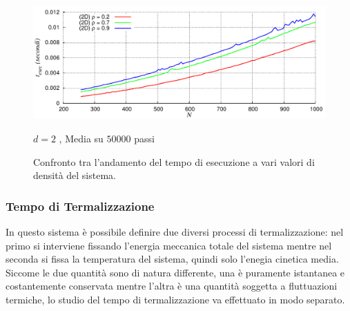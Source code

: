 	\begin{figure}[htbp]
		\centering
		\caption[Sfere Soffici$/$Preliminari\_TempoEsecuzione.cpp]{Confronto tra l'andamento del tempo di esecuzione a vari valori di densità del sistema.}\label{fig: T_Esec_Confronto_rho Soffici}\vspace{-15pt}
		\includegraphics[scale=0.85]{Immagini/Soffici/TempoEsecuzione2D}

		\centering  \footnotesize{$d=2$ , Media su $ 50000 $ passi}
	\end{figure}


\FloatBarrier 
\subsubsection{Tempo di Termalizzazione}
In questo sistema è possibile definire due diversi processi di termalizzazione: nel primo si interviene fissando l'energia meccanica totale del sistema mentre nel seconda si fissa la temperatura del sistema, quindi solo l'enegia cinetica media.
Siccome le due quantità sono di natura differente, una è puramente istantanea e costantemente conservata mentre l'altra è una quantità soggetta a fluttuazioni termiche, lo studio del tempo di termalizzazione va effettuato in modo separato.

